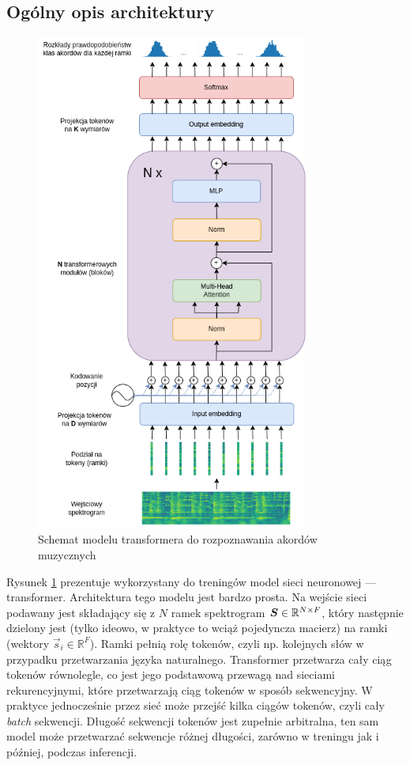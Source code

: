 \subsection{Ogólny opis architektury}

\begin{figure}
    \centering
    \includegraphics[width=0.8\textwidth]{./images/transformer.png}
    \caption{Schemat modelu transformera do rozpoznawania akordów muzycznych}
    \label{fig:transformer}
\end{figure}

Rysunek \ref{fig:transformer} prezentuje wykorzystany do treningów model sieci neuronowej ---
transformer. Architektura tego modelu jest bardzo prosta. Na wejście sieci podawany jest składający
się z $N$ ramek spektrogram $\boldsymbol{S} \in \mathbb{R}^{N \times F}$, który następnie dzielony jest (tylko ideowo, w
praktyce to wciąż pojedyncza macierz) na ramki (wektory $\vec s_i \in \mathbb{R}^F$). Ramki pełnią
rolę tokenów, czyli np. kolejnych słów w przypadku przetwarzania języka naturalnego. Transformer
przetwarza cały ciąg tokenów równolegle, co jest jego podstawową przewagą nad sieciami
rekurencyjnymi, które przetwarzają ciąg tokenów w sposób sekwencyjny. W praktyce jednocześnie przez
sieć może przejść kilka ciągów tokenów, czyli cały \emph{batch} sekwencji. Długość sekwencji tokenów
jest zupełnie arbitralna, ten sam model może przetwarzać sekwencje różnej długości, zarówno w
treningu jak i później, podczas inferencji.

